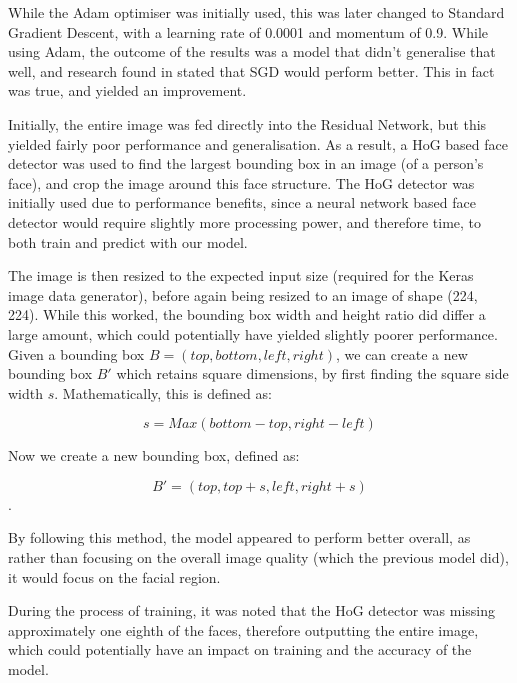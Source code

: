 \documentclass[10pt,a4paper]{article}
\begin{document}
        While the Adam optimiser was initially used, this was later changed to Standard Gradient Descent, with a learning rate of 0.0001 and momentum of 0.9.
        While using Adam, the outcome of the results was a model that didn't generalise that well, and research found in \cite{SGDBetterThanAdamForImageClassification}
        stated that SGD would perform better. This in fact was true, and yielded an improvement. 

        Initially, the entire image was fed directly into the Residual Network, but this yielded fairly poor performance and generalisation. As a result,
        a HoG based face detector was used to find the largest bounding box in an image (of a person's face), and crop the image around this face structure. The HoG detector was
        initially used due to performance benefits, since a neural network based face detector would require slightly more processing power, and therefore time, to both train and
        predict with our model.

        The image is then resized to the expected input size (required for the Keras image data generator), before again being resized to an image of shape (224, 224).
        While this worked, the bounding box width and height ratio did differ a large amount, which could potentially have yielded slightly poorer performance.
        Given a bounding box $B = (top, bottom, left, right)$, we can create a new bounding box $B'$ which retains square dimensions, by first finding the square
        side width $s$. Mathematically, this is defined as:

        $$s = Max(bottom - top, right - left)$$

        Now we create a new bounding box, defined as:

        $$B' = (top, top + s, left, right + s)$$.

        By following this method, the model appeared to perform better overall, as rather than focusing on the overall image quality (which the previous model did),
        it would focus on the facial region.

        During the process of training, it was noted that the HoG detector was missing approximately one eighth of the faces, therefore outputting the entire image, which
        could potentially have an impact on training and the accuracy of the model.
        
\end{document}
